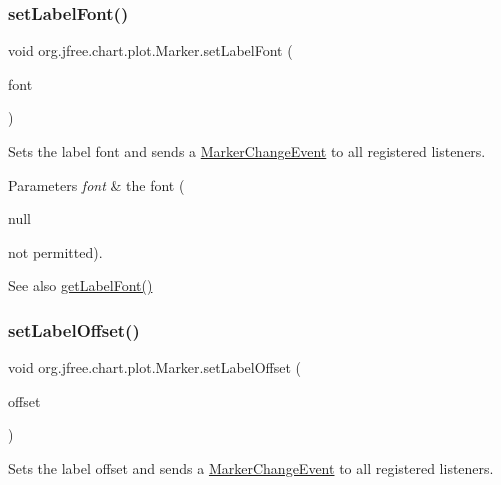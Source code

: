 \subsubsection{\texorpdfstring{set\+Label\+Font()}{setLabelFont()}}
{\footnotesize\ttfamily void org.\+jfree.\+chart.\+plot.\+Marker.\+set\+Label\+Font (\begin{DoxyParamCaption}\item[{Font}]{font }\end{DoxyParamCaption})}

Sets the label font and sends a \mbox{\hyperlink{}{Marker\+Change\+Event}} to all registered listeners.


\begin{DoxyParams}{Parameters}
{\em font} & the font (
\begin{DoxyCode}
null 
\end{DoxyCode}
 not permitted).\\
\hline
\end{DoxyParams}
\begin{DoxySeeAlso}{See also}
\mbox{\hyperlink{classorg_1_1jfree_1_1chart_1_1plot_1_1_marker_a917624a7c9cd70529447d3db29ccb9cc}{get\+Label\+Font()}} 
\end{DoxySeeAlso}
\mbox{\label{classorg_1_1jfree_1_1chart_1_1plot_1_1_marker_a38b7f54bed2200e77aac141fa1fd3980}} 
\subsubsection{\texorpdfstring{set\+Label\+Offset()}{setLabelOffset()}}
{\footnotesize\ttfamily void org.\+jfree.\+chart.\+plot.\+Marker.\+set\+Label\+Offset (\begin{DoxyParamCaption}\item[{Rectangle\+Insets}]{offset }\end{DoxyParamCaption})}

Sets the label offset and sends a \mbox{\hyperlink{}{Marker\+Change\+Event}} to all registered listeners.


